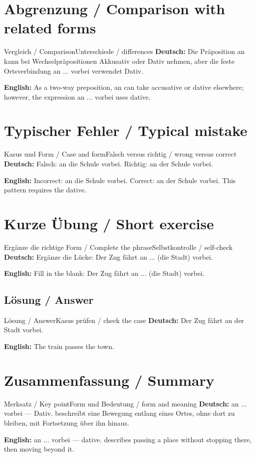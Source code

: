 \documentclass[a4paper,11pt]{article}
\newcommand{\GermanText}[1]{\textbf{Deutsch: }#1\par}
\newcommand{\EnglishText}[1]{{\small\color{SoftGray}\textbf{English: }#1\par}}
\begin{document}
\section{Abgrenzung / Comparison with related forms}
\begin{grammarentry}{Vergleich / Comparison}{Unterschiede / differences}
\GermanText{Die Präposition an kann bei Wechselpräpositionen Akkusativ oder Dativ nehmen, aber die feste Ortsverbindung an ... vorbei verwendet Dativ.}
\EnglishText{As a two-way preposition, an can take accusative or dative elsewhere; however, the expression an ... vorbei uses dative.}
\end{grammarentry}
\section{Typischer Fehler / Typical mistake}
\begin{grammarentry}{Kasus und Form / Case and form}{Falsch versus richtig / wrong versus correct}
\GermanText{Falsch: an die Schule vorbei. Richtig: an der Schule vorbei.}
\EnglishText{Incorrect: an die Schule vorbei. Correct: an der Schule vorbei. This pattern requires the dative.}
\end{grammarentry}
\section{Kurze Übung / Short exercise}
\begin{grammarentry}{Ergänze die richtige Form / Complete the phrase}{Selbstkontrolle / self-check}
\GermanText{Ergänze die Lücke: Der Zug fährt an ... (die Stadt) vorbei.}
\EnglishText{Fill in the blank: Der Zug fährt an ... (die Stadt) vorbei.}
\end{grammarentry}
\subsection{Lösung / Answer}
\begin{grammarentry}{Lösung / Answer}{Kasus prüfen / check the case}
\GermanText{Der Zug fährt an der Stadt vorbei.}
\EnglishText{The train passes the town.}
\end{grammarentry}
\section{Zusammenfassung / Summary}
\begin{grammarentry}{Merksatz / Key point}{Form und Bedeutung / form and meaning}
\GermanText{an ... vorbei — Dativ. beschreibt eine Bewegung entlang eines Ortes, ohne dort zu bleiben, mit Fortsetzung über ihn hinaus.}
\EnglishText{an ... vorbei — dative. describes passing a place without stopping there, then moving beyond it.}
\end{grammarentry}
\end{document}
